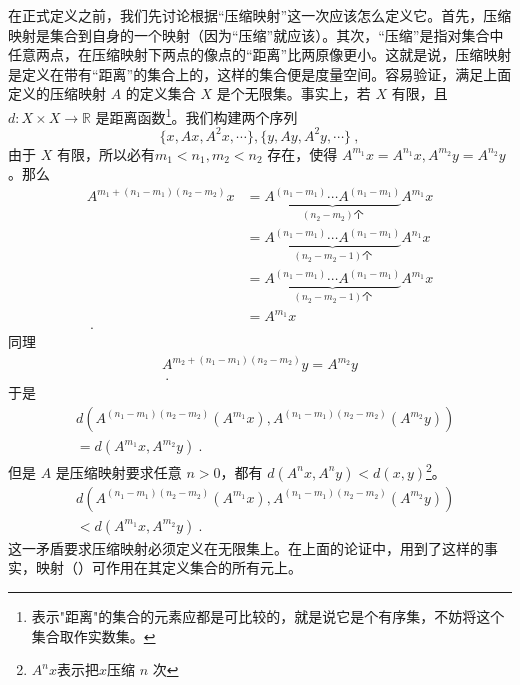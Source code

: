 在正式定义之前，我们先讨论根据“压缩映射”这一次应该怎么定义它。首先，压缩映射是集合到自身的一个映射（因为“压缩”就应该）。其次，“压缩”是指对集合中任意两点，在压缩映射下两点的像点的“距离”比两原像更小。这就是说，压缩映射是定义在带有“距离”的集合上的，这样的集合便是度量空间。容易验证，满足上面定义的压缩映射 $A$ 的定义集合 $X$ 是个无限集。事实上，若 $X$ 有限，且 $d:X\times X\rightarrow \mathbb R$ 是距离函数\footnote{表示"距离"的集合的元素应都是可比较的，就是说它是个有序集，不妨将这个集合取作实数集。}。我们构建两个序列
\begin{equation}
\{x,Ax,A^2x,\cdots\},\{y,Ay,A^2y,\cdots\}~,
\end{equation}
由于 $X$ 有限，所以必有$m_1<n_1,m_2<n_2$ 存在，使得 $A^{m_1}x=A^{n_1}x,A^{m_2}y=A^{n_2}y$ 。那么
\begin{equation}
\begin{aligned}
A^{m_1+(n_1-m_1)(n_2-m_2)}x&=\underbrace{A^{(n_1-m_1)}\cdots A^{(n_1-m_1)}}_{(n_2-m_2)\text{个}}A^{m_1}x\\
&=\underbrace{A^{(n_1-m_1)}\cdots A^{(n_1-m_1)}}_{(n_2-m_2-1)\text{个}}A^{n_1}x\\
&=\underbrace{A^{(n_1-m_1)}\cdots A^{(n_1-m_1)}}_{(n_2-m_2-1)\text{个}}A^{m_1}x\\
&=A^{m_1}x\\~.
\end{aligned}
\end{equation}
同理
\begin{equation}
\begin{aligned}
A^{m_2+(n_1-m_1)(n_2-m_2)}y=A^{m_2}y\\~.
\end{aligned}
\end{equation}
于是
\begin{equation}
\begin{aligned}
&d(A^{(n_1-m_1)(n_2-m_2)}(A^{m_1}x),A^{(n_1-m_1)(n_2-m_2)}(A^{m_2}y))\\
&=d(A^{m_1}x,A^{m_2}y)~.
\end{aligned}
\end{equation}
但是 $A$ 是压缩映射要求任意 $n>0$，都有 $d(A^n x,A^n y)<d(x,y)$\footnote{$A^n x$表示把$x$压缩 $n$ 次}。
\begin{equation}
\begin{aligned}
&d(A^{(n_1-m_1)(n_2-m_2)}(A^{m_1}x),A^{(n_1-m_1)(n_2-m_2)}(A^{m_2}y))\\
&<d(A^{m_1}x,A^{m_2}y)~.
\end{aligned}
\end{equation}
这一矛盾要求压缩映射必须定义在无限集上。在上面的论证中，用到了这样的事实，映射（）可作用在其定义集合的所有元上。